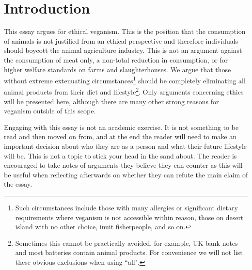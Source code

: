 

\section{Introduction}

This essay argues for ethical veganism. This is the position that the consumption of animals is not justified from an ethical perspective and therefore individuals should boycott the animal agriculture industry. This is not an argument against the consumption of meat only, a non-total reduction in consumption, or for higher welfare standards on farms and slaughterhouses. We argue that those without extreme extenuating circumstances\footnote{Such circumstances include those with many allergies or significant dietary requirements where veganism is not accessible within reason, those on desert island with no other choice, inuit fisherpeople, and so on.} should be completely eliminating all animal products from their diet and lifestyle\footnote{Sometimes this cannot be practically avoided, for example, UK bank notes and most batteries contain animal products. For convenience we will not list these obvious exclusions when using ``all".}. Only arguments concerning ethics will be presented here, although there are many other strong reasons for veganism outside of this scope.

Engaging with this essay is not an academic exercise. It is not something to be read and then moved on from, and at the end the reader will need to make an important decision about who they are as a person and what their future lifestyle will be. This is not a topic to stick your head in the sand about. The reader is encouraged to take notes of arguments they believe they can counter as this will be useful when reflecting afterwards on whether they can refute the main claim of the essay.

